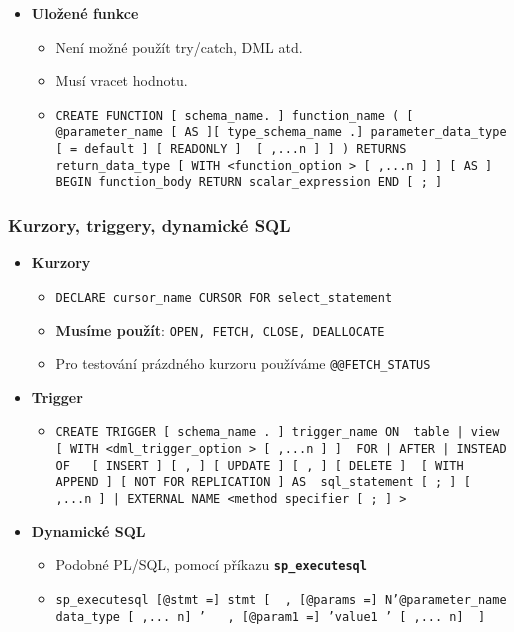 \begin{itemize}
\item \textbf{Uložené funkce}
\begin{itemize}
\item Není možné použít try/catch, DML atd.
\item Musí vracet hodnotu.
\item \texttt{CREATE FUNCTION [ schema\_name. ] function\_name ( [ { @parameter\_name [ AS ][ type\_schema\_name .] parameter\_data\_type [ = default ] [ READONLY ] } [ ,...n ] ] ) RETURNS return\_data\_type [ WITH <function\_option > [ ,...n ] ] [ AS ] BEGIN function\_body RETURN scalar\_expression END [ ; ]}
\end{itemize}
\end{itemize}



\subsubsection{Kurzory, triggery, dynamické SQL}
\begin{itemize}
\item \textbf{Kurzory}
\begin{itemize}
\item \texttt{DECLARE cursor\_name CURSOR FOR select\_statement }
\item \textbf{Musíme použít}: \texttt{OPEN, FETCH, CLOSE, DEALLOCATE }
\item Pro testování prázdného kurzoru používáme \texttt{@@FETCH\_STATUS}
\end{itemize}

\item \textbf{Trigger}
\begin{itemize}
\item \texttt{CREATE TRIGGER [ schema\_name . ] trigger\_name ON { table | view } [ WITH <dml\_trigger\_option > [ ,...n ] ] { FOR | AFTER | INSTEAD OF } { [ INSERT ] [ , ] [ UPDATE ] [ , ] [ DELETE ] } [ WITH APPEND ] [ NOT FOR REPLICATION ] AS { sql\_statement [ ; ] [ ,...n ] | EXTERNAL NAME <method specifier [ ; ] > }}
\end{itemize}

\item \textbf{Dynamické SQL}
\begin{itemize}
\item Podobné PL/SQL, pomocí příkazu \textbf{\texttt{sp\_executesql}}
\item \texttt{sp\_executesql [@stmt =] stmt [ { , [@params =] N’@parameter\_name data\_type [ ,... n] ’ } { , [@param1 =] ’value1 ’ [ ,... n] } ]}
\end{itemize}
\end{itemize}



